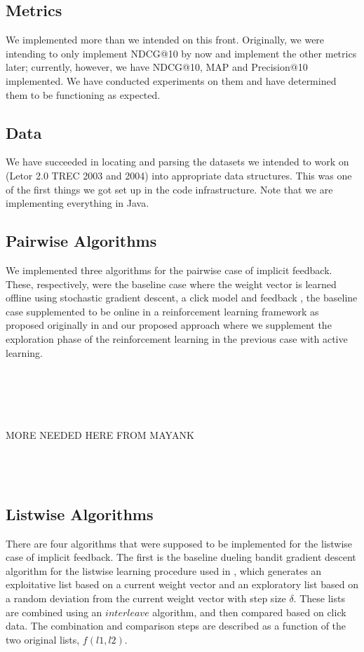 \documentclass{acm_proc_article-sp}
\begin{document}
\subsection{Metrics}

We implemented more than we intended on this front. Originally, we were intending to only implement NDCG@10 by now and implement the other metrics later; currently, however, we have NDCG@10, MAP and Precision@10 implemented. We have conducted experiments on them and have determined them to be functioning as expected. 

\subsection{Data}

We have succeeded in locating and parsing the datasets we intended to work on (Letor 2.0 TREC 2003 and 2004) into appropriate data structures. This was one of the first things we got set up in the code infrastructure. Note that we are implementing everything in Java. 

\subsection{Pairwise Algorithms}

We implemented three algorithms for the pairwise case of implicit feedback. These, respectively, were the baseline case where the weight vector is learned offline using stochastic gradient descent, a click model and feedback \cite{joachims}, the baseline case supplemented to be online in a reinforcement learning framework as proposed originally in \cite{hofmann} and our proposed approach where we supplement the exploration phase of the reinforcement learning in the previous case with active learning. \\ \\
\\ \\
\\ \\
MORE NEEDED HERE FROM MAYANK
\\ \\
 \\ \\

\subsection{Listwise Algorithms}
There are four algorithms that were supposed to be implemented for the listwise case of implicit feedback. The first is the baseline dueling bandit gradient descent algorithm for the listwise learning procedure used in \cite{hofmann}, which generates an exploitative list based on a current weight vector and an exploratory list based on a random deviation from the current weight vector with step size $\delta$.  These lists are combined using an $interleave$ algorithm, and then compared based on click data.  The combination and comparison steps are described as a function of the two original lists, $f(l1,l2)$. \\ \\
\end{document}
